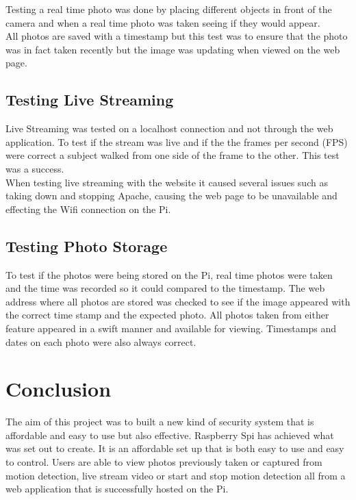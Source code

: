 \documentclass[12pt]{report}
\begin{document}
Testing a real time photo was done by placing different objects in front of the camera and when a real time photo was taken seeing if they would appear.\\

All photos are saved with a timestamp but this test was to ensure that the photo was in fact taken recently but the image was updating when viewed on the web page.\\


\section{Testing Live Streaming}
\label{sec:liveStreamTest}
%
Live Streaming was tested on a localhost connection and not through the web application. To test if the stream was live and if the the frames per second (FPS) were correct a subject walked from one side of the frame to the other. This test was a success.\\
 
When testing live streaming with the website it caused several issues such as taking down and stopping Apache, causing the web page to be unavailable and effecting the Wifi connection on the Pi.

\section{Testing Photo Storage}
\label{sec:photoStorageTest}
%
To test if the photos were being stored on the Pi, real time photos were taken and the time was recorded so it could compared to the timestamp. The web address where all photos are stored was checked to see if the image appeared with the correct time stamp and the expected photo. All photos taken from either feature appeared in a swift manner and available for viewing. Timestamps and dates on each photo were also always correct.\\


\chapter{Conclusion}
\label{ch:concl}
%
%
%
%
The aim of this project was to built a new kind of security system that is affordable and easy to use but also effective. Raspberry Spi has achieved what was set out to create. It is an affordable set up that is both easy to use and easy to control. Users are able to view photos previously taken or captured from motion detection, live stream video or start and stop motion detection all from a web application that is successfully hosted on the Pi. \\
\end{document}
